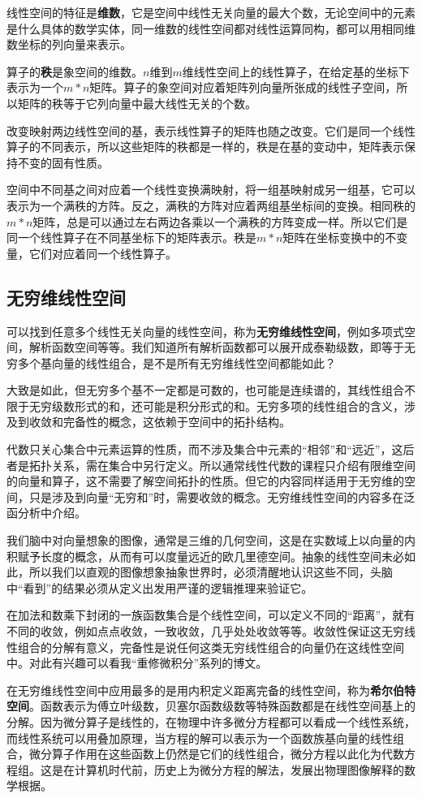 	线性空间的特征是\textbf{维数}，它是空间中线性无关向量的最大个数，无论空间中的元素是什么具体的数学实体，同一维数的线性空间都对线性运算同构，都可以用相同维数坐标的列向量来表示。
	
	算子的\textbf{秩}是象空间的维数。$ n $维到$ m $维线性空间上的线性算子，在给定基的坐标下表示为一个$ m*n $矩阵。算子的象空间对应着矩阵列向量所张成的线性子空间，所以矩阵的秩等于它列向量中最大线性无关的个数。
	
	改变映射两边线性空间的基，表示线性算子的矩阵也随之改变。它们是同一个线性算子的不同表示，所以这些矩阵的秩都是一样的，秩是在基的变动中，矩阵表示保持不变的固有性质。
	
	空间中不同基之间对应着一个线性变换满映射，将一组基映射成另一组基，它可以表示为一个满秩的方阵。反之，满秩的方阵对应着两组基坐标间的变换。相同秩的$ m*n $矩阵，总是可以通过左右两边各乘以一个满秩的方阵变成一样。所以它们是同一个线性算子在不同基坐标下的矩阵表示。秩是$ m*n $矩阵在坐标变换中的不变量，它们对应着同一个线性算子。
	
	\subsection{无穷维线性空间}
	
	可以找到任意多个线性无关向量的线性空间，称为\textbf{无穷维线性空间}，例如多项式空间，解析函数空间等等。我们知道所有解析函数都可以展开成泰勒级数，即等于无穷多个基向量的线性组合，是不是所有无穷维线性空间都能如此？
	
	大致是如此，但无穷多个基不一定都是可数的，也可能是连续谱的，其线性组合不限于无穷级数形式的和，还可能是积分形式的和。无穷多项的线性组合的含义，涉及到收敛和完备性的概念，这依赖于空间中的拓扑结构。
	
	代数只关心集合中元素运算的性质，而不涉及集合中元素的“相邻”和“远近”，这后者是拓扑关系，需在集合中另行定义。所以通常线性代数的课程只介绍有限维空间的向量和算子，这不需要了解空间拓扑的性质。但它的内容同样适用于无穷维的空间，只是涉及到向量“无穷和”时，需要收敛的概念。无穷维线性空间的内容多在泛函分析中介绍。
	
	我们脑中对向量想象的图像，通常是三维的几何空间，这是在实数域上以向量的内积赋予长度的概念，从而有可以度量远近的欧几里德空间。抽象的线性空间未必如此，所以我们以直观的图像想象抽象世界时，必须清醒地认识这些不同，头脑中“看到”的结果必须从定义出发用严谨的逻辑推理来验证它。
	
	在加法和数乘下封闭的一族函数集合是个线性空间，可以定义不同的“距离”，就有不同的收敛，例如点点收敛，一致收敛，几乎处处收敛等等。收敛性保证这无穷线性组合的分解有意义，完备性是说任何这类无穷线性组合的向量仍在这线性空间中。对此有兴趣可以看我“重修微积分”系列的博文。
	
	在无穷维线性空间中应用最多的是用内积定义距离完备的线性空间，称为\textbf{希尔伯特空间}。函数表示为傅立叶级数，贝塞尔函数级数等特殊函数都是在线性空间基上的分解。因为微分算子是线性的，在物理中许多微分方程都可以看成一个线性系统，而线性系统可以用叠加原理，当方程的解可以表示为一个函数族基向量的线性组合，微分算子作用在这些函数上仍然是它们的线性组合，微分方程以此化为代数方程组。这是在计算机时代前，历史上为微分方程的解法，发展出物理图像解释的数学根据。